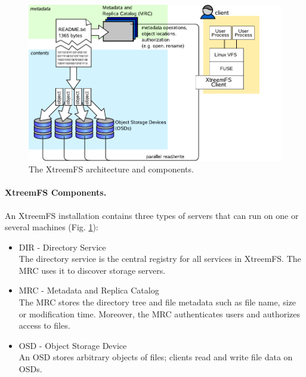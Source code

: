 \documentclass[a4paper,10pt]{book}
\begin{document}

\begin{figure}
 \centering
 \includegraphics[width=\textwidth]{images/architecture.pdf}
 \caption{The XtreemFS architecture and components.}
 \label{fig:architecture}
\end{figure}


\paragraph{XtreemFS Components.}
An XtreemFS installation contains three types of servers that can run on one or several machines (Fig. \ref{fig:architecture}):

\begin{itemize}
 \item DIR - Directory Service\\
 The directory service is the central registry for all services in XtreemFS. The MRC uses it to discover storage servers.
 \item MRC - Metadata and Replica Catalog\\
 The MRC stores the directory tree and file metadata such as file name, size or modification time. Moreover, the MRC authenticates users and authorizes access to files.
 \item OSD - Object Storage Device\\
 An OSD stores arbitrary objects of files; clients read and write file data on OSDs.
\end{itemize}
\end{document}
